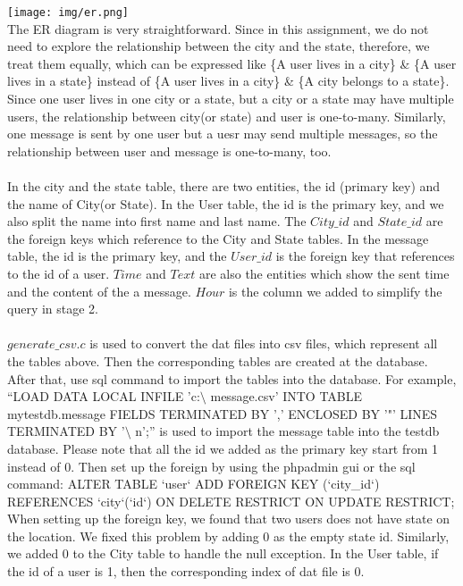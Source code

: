 \documentclass[a4paper]{article}
\begin{document}
\texttt{[image: img/er.png]}\\
The ER diagram is very straightforward. Since in this assignment, we do not need to explore the relationship between the city and the state, therefore, we treat them equally, which can be expressed like \{A user lives in a city\} \& \{A user lives in a state\} instead of \{A user lives in a city\} \& \{A city belongs to a state\}. Since one user lives in one city or a state, but a city or a state may have multiple users, the relationship between city(or state) and user is one-to-many. Similarly, one message is sent by one user but a uesr may send multiple messages, so the relationship between user and message is one-to-many, too.\\\\
In the city and the state table, there are two entities, the id (primary key) and the name of City(or State). In the User table, the id is the primary key, and we also split the name into first name and last name. The $City\_id$ and $State\_id$ are the foreign keys which reference to the City and State tables. In the message table, the id is the primary key, and the $User\_id$ is the foreign key that references to the id of a user. $Time$ and $Text$ are also the entities which show the sent time and the content of the a message. $Hour$ is the column we added to simplify the query in stage 2.\\ 
\\
$generate\_csv.c$ is used to convert the dat files into csv files, which represent all the tables above. Then the corresponding tables are created at the database. After that, use sql command to import the tables into the database. For example, “LOAD DATA LOCAL INFILE 'c:$\setminus$ message.csv' INTO TABLE mytestdb.message FIELDS TERMINATED BY ',' ENCLOSED BY '"' LINES TERMINATED BY '$\setminus$ n';”  is used to import the message table into the testdb database. Please note that all the id we added as the primary key start from 1 instead of 0. Then set up the foreign by using the phpadmin gui or the sql command: ALTER TABLE `user` ADD FOREIGN KEY (`city\_id`) REFERENCES `city`(`id`) ON DELETE RESTRICT ON UPDATE RESTRICT; When setting up the foreign key, we found that two users does not have state on the location. We fixed this problem by adding 0 as the empty state id. Similarly, we added 0 to the City table to handle the null exception. In the User table, if the id of a user is 1, then the corresponding index of dat file is 0.\\\\
\end{document}
